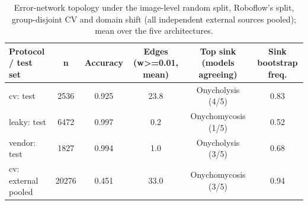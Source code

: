 \begin{table}[!tbp]
\centering
\caption{Error-network topology under the image-level random split, Roboflow's split, group-disjoint CV and domain shift (all independent external sources pooled); mean over the five architectures.}
\label{tab:snacompare}
\footnotesize
\begin{tabular}{lccccc}
\hline
Protocol / test set & n & Accuracy & Edges (w>=0.01, mean) & Top sink (models agreeing) & Sink bootstrap freq. \\
\hline
cv: test & 2536 & 0.925 & 23.8 & Onycholysis (4/5) & 0.83 \\
leaky: test & 6472 & 0.997 & 0.2 & Onychomycosis (1/5) & 0.52 \\
vendor: test & 1827 & 0.994 & 1.0 & Onycholysis (3/5) & 0.68 \\
cv: external pooled & 20276 & 0.451 & 33.0 & Onychomycosis (3/5) & 0.94 \\
\hline
\end{tabular}
\end{table}